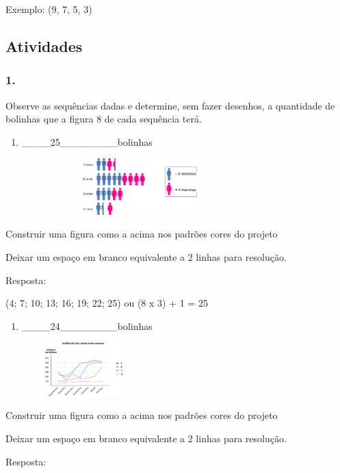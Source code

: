 Exemplo: (9, 7, 5, 3)

\subsection{Atividades}\label{atividades-2}

\subsubsection{1.}\label{section-26}

Observe as sequências dadas e determine, sem fazer desenhos, a
quantidade de bolinhas que a figura 8 de cada sequência terá.

\begin{enumerate}
\def\labelenumi{\alph{enumi})}
\item
  \_\_\_\_25\_\_\_\_\_\_\_\_bolinhas
\end{enumerate}

\includegraphics[width=4.09202in,height=0.85841in]{media/image39.png}

Construir uma figura como a acima nos padrões cores do projeto

Deixar um espaço em branco equivalente a 2 linhas para resolução.

Resposta:

(4; 7; 10; 13; 16; 19; 22; 25) ou (8 x 3) + 1 = 25

\begin{enumerate}
\def\labelenumi{\alph{enumi})}
\item
  \_\_\_\_24\_\_\_\_\_\_\_\_bolinhas
\end{enumerate}

\includegraphics[width=2.38354in,height=0.81674in]{media/image40.png}

Construir uma figura como a acima nos padrões cores do projeto

Deixar um espaço em branco equivalente a 2 linhas para resolução.

Resposta:

